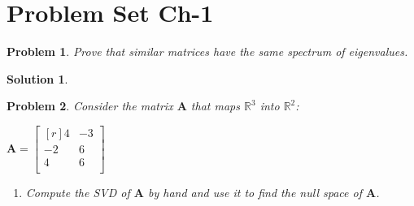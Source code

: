 \documentclass{article}
\newtheorem*{problem}{Problem}
\newtheorem*{solution}{Solution}
\begin{document}
\section*{Problem Set Ch-1}

\begin{problem}{1.2}
    Prove that similar matrices have the same spectrum of eigenvalues.
\end{problem}

\begin{solution}
    
\end{solution}

\begin{problem}{1.7}
    Consider the matrix $\mathbf{A}$ that maps $\mathbb{R}^3$ into $\mathbb{R}^2$:

    \begin{center}
        \begin{math}
            \mathbf{A}= 
                \begin{bmatrix*}[r]
                        4 & -3 \\
                        -2 & 6 \\
                        4 & 6 \\ 
                \end{bmatrix*}
        \end{math}
    \end{center}

    \begin{enumerate}[label=\alph*.]
        \item Compute the SVD of $\mathbf{A}$ by hand and use it to find the null space of $\mathbf{A}$.
    \end{enumerate}

\end{problem}
\end{document}
